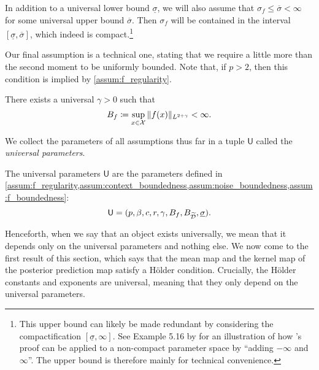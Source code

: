 \documentclass[12pt, twoside]{report}
\begin{document}
In addition to a universal lower bound $\underline{\sigma}$, we will also assume that $\sigma_f \le \overline{\sigma} < \infty$ for some universal upper bound $\overline{\sigma}$.
Then $\sigma_f$ will be contained in the interval $[\underline{\sigma}, \overline{\sigma}]$, which indeed is compact.\footnote{
    This upper bound can likely be made redundant by considering the compactification $[\underline{\sigma}, \infty]$.
    See Example 5.16 by \textcite{Vaart:1998:Asymptotic_Statistics} for an illustration of how \citeauthor{Wald:1949:Note_on_the_Consistency_of}'s proof can be applied to a non-compact parameter space by ``adding $-\infty$ and $\infty$''.
    The upper bound is therefore mainly for technical convenience.
}

Our final assumption is a technical one, stating that we require a little more than the second moment to be uniformly bounded.
Note that, if $p > 2$, then this condition is implied by \cref{assum:f_regularity}.

\begin{assumption} \label{assum:f_boundedness}
    There exists a universal $\gamma > 0$ such that
    \begin{equation}
        B_f \coloneqq \operatorname*{sup}_{x \in \mathcal{X}}\, \lVert f(x)\rVert_{L^{2 + \gamma}} < \infty.
    \end{equation}
\end{assumption}

We collect the parameters of all assumptions thus far in a tuple $\mathrm{\textsf{U}}$ called the \emph{universal parameters}.

\begin{definition}
    The universal parameters $\mathrm{\textsf{U}}$ are the parameters defined in \cref{assum:f_regularity,assum:context_boundedness,assum:noise_boundedness,assum:f_boundedness}:
    \begin{equation}
        \mathrm{\textsf{U}} = (p, \beta, c, r, \gamma, B_f, B_{\widetilde{\mathcal{D}}}, \underline{\sigma}).
    \end{equation}
\end{definition}

Henceforth, when we say that an object exists universally, we mean that it depends only on the universal parameters and nothing else.
We now come to the first result of this section, which says that the mean map and the kernel map of the posterior prediction map satisfy a H\"older condition.
Crucially, the H\"older constants and exponents are universal, meaning that they only depend on the universal parameters.
\end{document}
